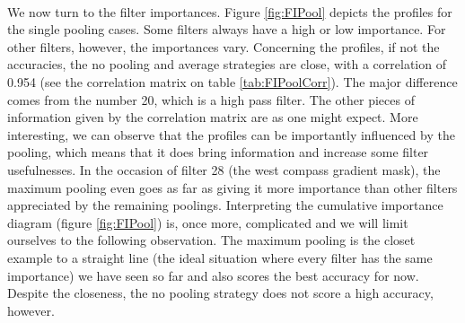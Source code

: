 \documentclass[a4paper]{report}
\begin{document}
	\paragraph{}
	We now turn to the filter importances. Figure \ref{fig:FIPool} depicts the profiles for the single pooling cases. Some filters always have a high or low importance. For other filters, however, the importances vary. Concerning the profiles, if not the accuracies, the no pooling and average strategies are close, with a correlation of 0.954 (see the correlation matrix on table \ref{tab:FIPoolCorr}). The major difference comes from the number 20, which is a high pass filter. %
	The other pieces of information given by the correlation matrix are as one might expect.
	More interesting, we can observe that the profiles can be importantly influenced by the pooling, which means that it does bring information and increase some filter usefulnesses. In the occasion of filter 28 (the west compass gradient mask), the maximum pooling even goes as far as giving it more importance than other filters appreciated by the remaining poolings. 
	Interpreting the cumulative importance diagram (figure \ref{fig:FIPool}) is, once more, complicated and we will limit ourselves to the following observation. The maximum pooling is the closet example to a straight line (the ideal situation where every filter has the same importance) we have seen so far and also scores the best accuracy for now. Despite the closeness, the no pooling strategy does not score a high accuracy, however.
	
\end{document}
